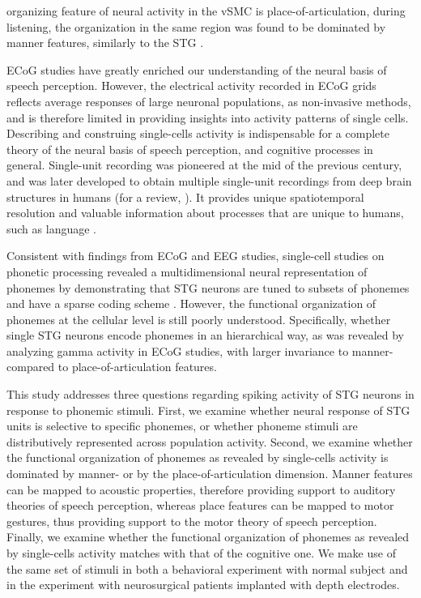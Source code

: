 organizing feature of neural activity in the vSMC is place-of-articulation, during listening, the organization in the same region was found to be dominated by manner features, similarly to the STG \citep{cheung2016auditory}.

ECoG studies have greatly enriched our understanding of the neural basis of speech perception.  However, the electrical activity recorded in ECoG grids reflects average responses of large neuronal populations, as non-invasive methods, and is therefore limited in providing insights into activity patterns of single cells. Describing and construing single-cells activity is indispensable for a complete theory of the neural basis of speech perception, and cognitive processes in general. Single-unit recording was pioneered at the mid of the previous century, and was later developed to obtain multiple single-unit recordings from deep brain structures in humans \citep{fried1999cerebral} (for a review, \citealp{engel2005invasive, mukamel2012human, cash2015emergence}). It provides unique spatiotemporal resolution and valuable information about processes that are unique to humans, such as language \citep{heit1988neural, creutzfeldt1989neuronal, tankus2012structured, ossmy2015decoding}.

Consistent with findings from ECoG and EEG studies, single-cell studies on phonetic processing revealed a multidimensional neural representation of phonemes by demonstrating that STG neurons are tuned to subsets of phonemes and have a sparse coding scheme \citep{creutzfeldt1989neuronal, chan2013speech}. However, the functional organization of phonemes at the cellular level is still poorly understood. Specifically, whether single STG neurons encode phonemes in an hierarchical way, as was revealed by analyzing gamma activity in ECoG studies, with larger invariance to manner- compared to place-of-articulation features.

This study addresses three questions regarding spiking activity of STG neurons in response to phonemic stimuli. First, we examine whether neural response of STG units is selective to specific phonemes, or whether phoneme stimuli are distributively represented across population activity. Second, we examine whether the functional organization of phonemes as revealed by single-cells activity is dominated by manner- or by the place-of-articulation dimension. Manner features can be mapped to acoustic properties, therefore providing support to auditory theories of speech perception, whereas place features can be mapped to motor gestures, thus providing support to the motor theory of speech perception. Finally, we examine whether the functional organization of phonemes as revealed by single-cells activity matches with that of the cognitive one. We make use of the same set of stimuli in both a behavioral experiment with normal subject and in the experiment with neurosurgical patients implanted with depth electrodes.

